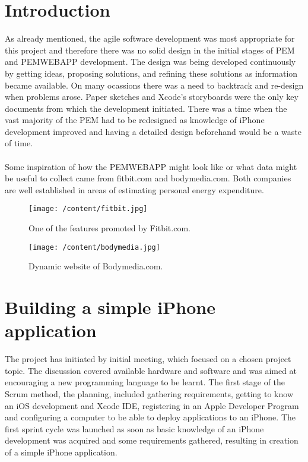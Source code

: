 \documentclass[12pt, a4paper]{report}   %
\begin{document}
\begin{enumerate}
\section{Introduction}
As already mentioned, the agile software development was most appropriate for this project and therefore there was no solid design in the initial stages of PEM and PEMWEBAPP development.
The design was being developed continuously by getting ideas, proposing solutions, and refining these solutions as information became available. On many ocassions there was a need to backtrack and re-design when problems arose. Paper sketches and Xcode's storyboards were the only key documents from which the development initiated. There was a time when the vast majority of the PEM had to be redesigned as knowledge of iPhone development improved and having a detailed design beforehand would be a waste of time.\\ \\
Some inspiration of how the PEMWEBAPP might look like or what data might be useful to collect came from fitbit.com and bodymedia.com. Both companies are well established in areas of estimating personal energy expenditure.

\begin{figure}[H]
  \centering
	\texttt{[image: /content/fitbit.jpg]}
	  \caption{One of the features promoted by Fitbit.com.}
\end{figure}

\begin{figure}[H]
  \centering
	\texttt{[image: /content/bodymedia.jpg]}
	  \caption{Dynamic website of Bodymedia.com.}
\end{figure}

\clearpage
\section{Building a simple iPhone application}
The project has initiated by initial meeting, which focused on a chosen project topic. The discussion covered available hardware and software and was aimed at encouraging a new programming language to be learnt. The first stage of the Scrum method, the planning, included gathering requirements, getting to know an iOS development and Xcode IDE, registering in an Apple Developer Program and configuring a computer to be able to deploy applications to an iPhone. The first sprint cycle was launched as soon as basic knowledge of an iPhone development was acquired and some requirements gathered, resulting in creation of a simple iPhone application.


\end{enumerate}
\end{document}
